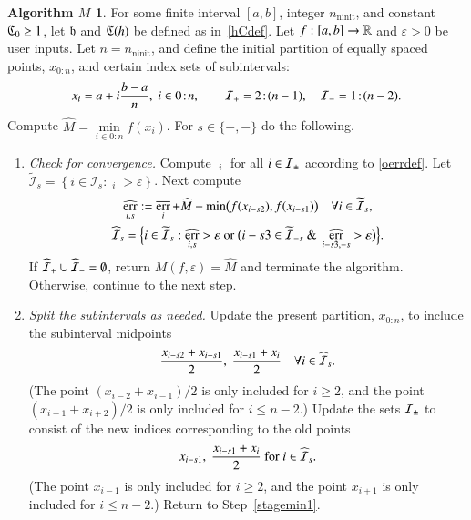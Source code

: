 \documentclass[review]{elsarticle}
\newcommand{\abstol}{\varepsilon}
\newcommand{\zton}{0\!:\!n}
\theoremstyle{definition}
\newtheorem*{algoM}{Algorithm $M$}
\newcommand{\hM}{\widehat{M}}
\DeclareMathOperator{\ninit}{ninit}
\DeclareMathOperator{\oerr}{\overline{err}}
\DeclareMathOperator{\herr}{\widehat{err}}
\newcommand{\minfi}{\min\limits_{i \in 0:n} f(x_i)} %
\begin{document}
\begin{algoM} \label{AlgoM}
	For some finite interval $[a,b]$, integer $n_{\ninit}$, and constant $\mathfrak{C}_0 \ge 1$, let
	$\mathfrak{h}$ and $\mathfrak{C}(h)$ be defined as in~\eqref{hCdef}.  Let $f:[a,b] \to \mathbb{R}$ and
	$\abstol >0$ be user inputs. Let
	$n=n_{\ninit}$, and define the initial partition of equally spaced points, $x_{0:n}$, and
	certain index sets of subintervals:
\[
x_i=a+ i\frac{b-a}{n}, \ i \in \zton, \qquad \ci_{+} =  2\!:\!(n-1), \quad \ci_{-} =  1\!:\!(n-2).
\]
	Compute $\hM= \minfi$.   For $ s \in \{+,-\}$ do the following.
	
	\begin{enumerate}[\em Step 1.]
		
		\item \label{stagemin1} \emph{Check for convergence.}
		Compute $\oerr_i $ for all $i \in \mathcal{I}_{\pm}$ according to \eqref{oerrdef}. Let
		$\widetilde{\mathcal{I}}_{s} = \left\{i \in \mathcal{I}_{s}: \oerr_i
		> \abstol \right\}$.  Next compute
		\begin{gather*}
		\herr_{i,s} := \oerr_i + \hM - \min\bigl(f(x_{i - s2}),f(x_{i-s1})\bigr) \quad
		\forall i \in \widetilde{\mathcal{I}}_{s}, 	\\
		\widehat{\ci}_s = \Bigl\{i \in \widetilde{\ci}_s:  \herr_{i,s} > \abstol \text{ or }
		\bigl( i-s3 \in \widetilde{\ci}_{-s} \text{ \& } \herr_{i-s3,-s} > \abstol \bigr) \Bigr\}.	
		\end{gather*}
		If $\widehat{\mathcal{I}}_+ \cup \widehat{\mathcal{I}}_- =
		\emptyset$, return $M(f,\abstol) = \widehat{M}$ and terminate the algorithm.
		Otherwise, continue to the next step.
		
		\item \label{stagemin2} \emph{Split the subintervals as needed.}
		Update the present partition, $x_{0:n}$, to include the subinterval midpoints
		\begin{equation*}
		\frac{x_{i-s2} +x_{i-s1}}{2}, \ \frac{x_{i-s1} +x_{i}}{2} \quad \forall i \in \widehat{\mathcal{I}}_s.
		\end{equation*}
    	(The point $(x_{i-2}+x_{i-1})/2$ is only included for $i \ge 2$, and the point
		$(x_{i+1} +x_{i+2})/2$ is only included for $i \le n-2$.)  Update the sets
		 $\mathcal{I}_{\pm}$ to consist of the new indices corresponding to the old points
		\[
		x_{i-s1}, \ \frac{x_{i-s1} +x_{i}}{2} \text{ for } i \in \widehat{\mathcal{I}}_s.
		\]
		(The point $x_{i-1}$ is only included for $i \ge 2$, and the point $x_{i+1}$ is only
		included for $i \le n-2$.) Return to Step~\ref{stagemin1}.
	\end{enumerate}
\end{algoM}
\end{document}

